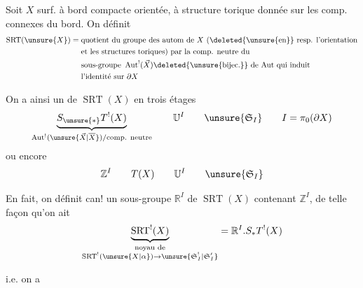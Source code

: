 

Soit $X$ surf. à bord compacte orientée, à structure torique
donnée sur les comp. connexes du bord.
On définit
\[
\begin{aligned}
\operatorname{SRT}(\unsure{X})={}&
\text{quotient du groupe des autom de }X
\text{ (\deleted{\unsure{en}} resp. l'orientation}\\
&\text{et les structures toriques) par la comp. neutre du}\\
&\text{sous-groupe }\operatorname{Aut}^!(\vec X)
\deleted{\unsure{\mathrm{bijec.}}}
\text{ de Aut qui induit}\\
&\text{l'identité sur }\partial X
\end{aligned}
\]

On a ainsi un  de $\operatorname{SRT}(X)$ en trois étages
\[
\underbrace{S_{\unsure{*}}T^!(X)}_{
\operatorname{Aut}^!(\unsure{\vec X|\overline X})/
\text{comp. neutre}}
\qquad\mathbb U^I\qquad\unsure{\mathfrak S_I}
\qquad I=\pi_0(\partial X)
\]
ou encore
\[
\mathbb Z^I\qquad T(X)\qquad\mathbb U^I\qquad\unsure{\mathfrak S_I}
\]

En fait, on définit can! un sous-groupe 
$\mathbb R^I$ de $\operatorname{SRT}(X)$
contenant $\mathbb Z^I$, de telle façon qu'on ait
\[
\underbrace{\operatorname{SRT}^!(X)}_{
\substack{\text{noyau de}\\
\operatorname{SRT}^!(\unsure{X|\alpha})\to\unsure{\mathfrak S_I^!|\mathfrak S_I'}}}
=\mathbb R^I.S_*T^!(X)
\]


i.e. on a




